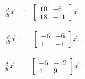 \begin{problem}
\begin{subproblem}
        \vfill
        \clearpage


      \item 
        \begin{eqnarray*}
          \frac{d}{dt} \vec{x} & = & 
          \left[ \begin{array}{rr}
              10 &  -6 \\
              18 & -11
            \end{array} \right] \vec{x}.
        \end{eqnarray*}

        \vfill
        \clearpage

    \item 
        \begin{eqnarray*}
          \frac{d}{dt} \vec{x} & = & 
          \left[ \begin{array}{rr}
               -6 & -6 \\
                1 & -1
            \end{array} \right] \vec{x}.
        \end{eqnarray*}

        \vfill
        \clearpage


      \item 
        \begin{eqnarray*}
          \frac{d}{dt} \vec{x} & = & 
          \left[ \begin{array}{rr}
              -5 &  -12 \\
               4 &    9
            \end{array} \right] \vec{x}.
        \end{eqnarray*}

        \vfill


    \end{subproblem}


\end{problem}

